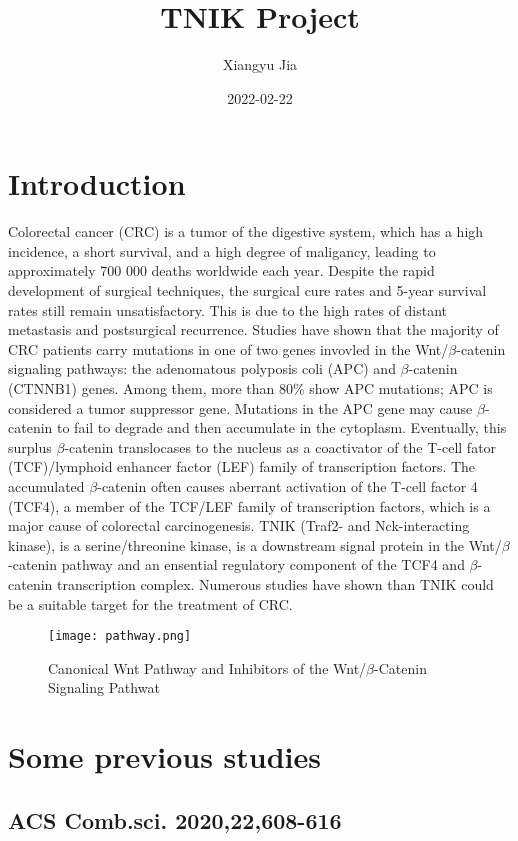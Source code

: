 \documentclass{article}
\title{TNIK Project}
\date{2022-02-22}
\author{Xiangyu Jia}
\begin{document}
\maketitle
\newpage
{}

\section{Introduction}
Colorectal cancer (CRC) is a tumor of the digestive system, which has a high incidence, a short survival, 
and a high degree of maligancy, leading to approximately 700 000 deaths worldwide each year. Despite the rapid development of
surgical techniques, the surgical cure rates and 5-year survival rates still remain unsatisfactory. This is due to the high rates
of distant metastasis and postsurgical recurrence. Studies have shown that the majority of CRC patients carry mutations in one 
of two genes invovled in the Wnt/$\beta$-catenin signaling pathways: the adenomatous polyposis coli (APC) and $\beta$-catenin 
(CTNNB1) genes. Among them, more than 80\% show APC mutations; APC is considered a tumor suppressor gene. Mutations in the APC gene
 may cause $\beta$-catenin to fail to degrade and then accumulate in the cytoplasm. Eventually, this surplus $\beta$-catenin 
 translocases to the nucleus as a coactivator of the T-cell fator (TCF)/lymphoid enhancer factor (LEF) family of transcription 
 factors. The accumulated $\beta$-catenin often causes aberrant activation of the T-cell factor 4 (TCF4), a member of the TCF/LEF 
 family of transcription factors, which is a major cause of colorectal carcinogenesis. TNIK (Traf2- and Nck-interacting kinase), is 
 a serine/threonine kinase, is a downstream signal protein in the Wnt/$\beta$-catenin pathway and an ensential regulatory component 
 of the TCF4 and $\beta$-catenin transcription complex. Numerous studies have shown than TNIK could be a suitable target for the 
 treatment of CRC.

\begin{figure}[h]
  \texttt{[image: pathway.png]}
  \caption{Canonical Wnt Pathway and Inhibitors of the Wnt/$\beta$-Catenin Signaling Pathwat}
  \label{pathway}
\end{figure}


\section{Some previous studies}
\subsection{ACS Comb.sci. 2020,22,608-616}
\end{document}
